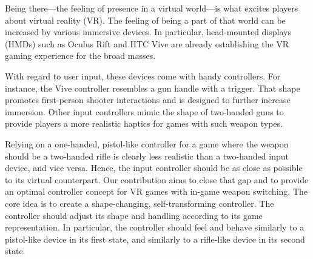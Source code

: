 \documentclass{sigchi}
\begin{document}
Being there---the feeling of presence in a virtual world---is what excites players about virtual reality (VR). The feeling of being a part of that world can be increased by various immersive devices. In particular, head-mounted displays (HMDs) such as Oculus Rift and HTC Vive are already establishing the VR gaming experience for the broad masses. 

With regard to user input, these devices come with handy controllers. For instance, the Vive controller resembles a gun handle with a trigger. That shape promotes first-person shooter interactions and is designed to further increase immersion. Other input controllers mimic the shape of two-handed guns to provide players a more realistic haptics for games with such weapon types.

Relying on a one-handed, pistol-like controller for a game where the weapon should be a two-handed rifle is clearly less realistic than a two-handed input device, and vice versa. Hence, the input controller should be as close as possible to its virtual counterpart. Our contribution aims to close that gap and to provide an optimal controller concept for VR games with in-game weapon switching. The core idea is to create a shape-changing, self-transforming controller. The controller should adjust its shape and handling according to its game representation. In particular, the controller should feel and behave similarly to a pistol-like device in its first state, and similarly to a rifle-like device in its second state. 

%
%
\end{document}
